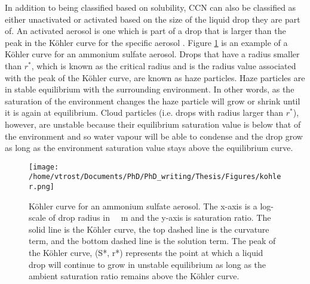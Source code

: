 In addition to being classified based on solubility, CCN can also be classified as either unactivated or activated based on the size of the liquid drop they are part of. An activated aerosol is one which is part of a drop that is larger than the peak in the K\"ohler curve for the specific aerosol \citep{rog1989,bouc2015}. Figure \ref{fig:kohler} is an example of a K\"ohler curve for an ammonium sulfate aerosol. Drops that have a radius smaller than $r^{*}$, which is known as the critical radius and is the radius value associated with the peak of the K\"ohler curve, are known as haze particles. Haze particles are in stable equilibrium with the surrounding environment. In other words, as the saturation of the environment changes the haze particle will grow or shrink until it is again at equilibrium. Cloud particles (i.e. drops with radius larger than $r^{*}$), however, are unstable because their equilibrium saturation value is below that of the environment and so water vapour will be able to condense and the drop grow as long as the environment saturation value stays above the equilibrium curve. \citep{rog1989, lamb2011}

\begin{figure}[H]
	\centering
	\texttt{[image: /home/vtrost/Documents/PhD/PhD\_writing/Thesis/Figures/kohler.png]}
	\caption{K\"ohler curve for an ammonium sulfate aerosol. The x-axis is a log-scale of drop radius in \SI{}{\mu m} and the y-axis is saturation ratio. The solid line is the K\"ohler curve, the top dashed line is the curvature term, and the bottom dashed line is the solution term. The peak of the K\"ohler curve, (S*, r*) represents the point at which a liquid drop will continue to grow in unstable equilibrium as long as the ambient saturation ratio remains above the K\"ohler curve. \citep[][Figure 6.2]{rog1989}}
	\label{fig:kohler}
\end{figure}

